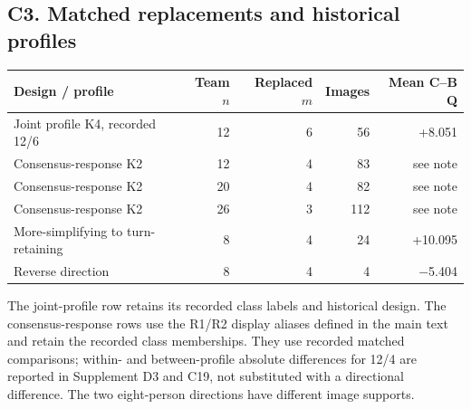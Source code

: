 \documentclass[10pt]{article}
\begin{document}
\subsection*{C3. Matched replacements and historical profiles}
\begin{center}\small
\begin{tabular}{lrrrr}
\toprule Design / profile & Team $n$ & Replaced $m$ & Images & Mean C--B Q \\
\midrule
Joint profile K4, recorded 12/6 & 12 & 6 & 56 & +8.051 \\
Consensus-response K2 & 12 & 4 & 83 & see note \\
Consensus-response K2 & 20 & 4 & 82 & see note \\
Consensus-response K2 & 26 & 3 & 112 & see note \\
More-simplifying to turn-retaining & 8 & 4 & 24 & +10.095 \\
Reverse direction & 8 & 4 & 4 & $-$5.404 \\
\bottomrule
\end{tabular}\end{center}
The joint-profile row retains its recorded class labels and historical design. The consensus-response rows use the R1/R2 display aliases defined in the main text and retain the recorded class memberships. They use recorded matched comparisons; within- and between-profile absolute differences for 12/4 are reported in Supplement D3 and C19, not substituted with a directional difference. The two eight-person directions have different image supports.
\end{document}

